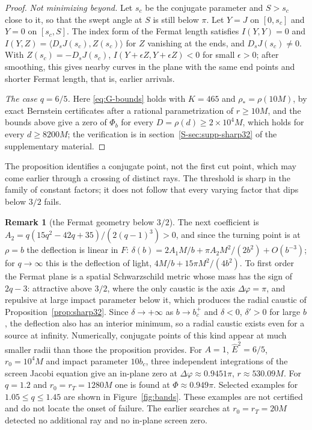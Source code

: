 \documentclass[aip,jmp,amsmath,amssymb,reprint]{revtex4-2}
\newcommand{\Ehat}{\hat E}
\theoremstyle{plain}
\theoremstyle{definition}
\newtheorem{remark}[proposition]{Remark}
\begin{document}
\begin{proof}
\emph{Not minimizing beyond.} Let $s_c$ be the conjugate parameter and $S>s_c$ close to it, so that the
swept angle at $S$ is still below $\pi$. Let $Y=J$ on $[0,s_c]$ and $Y=0$ on $[s_c,S]$. The index form of
the Fermat length satisfies $I(Y,Y)=0$ and $I(Y,Z)=\langle D_sJ(s_c),Z(s_c)\rangle$ for $Z$ vanishing at the
ends, and $D_sJ(s_c)\ne0$. With $Z(s_c)=-D_sJ(s_c)$, $I(Y+\epsilon Z,Y+\epsilon Z)<0$ for small $\epsilon>0$; after
smoothing, this gives nearby curves in the plane with the same end points and shorter Fermat
length, that is, earlier arrivals.

\emph{The case $q=6/5$.} Here \eqref{eq:G-bounds} holds with $K=465$ and $\rho_*=\rho(10M)$, by exact
Bernstein certificates after a rational parametrization of $r\ge10M$, and the bounds above give a zero of
$\Phi_b$ for every $D=\rho(d)\ge2\times10^4M$, which holds for every $d\ge8200M$; the verification is in
section~\ref{S-sec:supp-sharp32} of the supplementary material.
\end{proof}

The proposition identifies a conjugate point, not the first cut point, which may come earlier
through a crossing of distinct rays. The threshold is sharp in the family of constant factors;
it does not follow that every varying factor that dips below $3/2$ fails.

\begin{remark}[the Fermat geometry below $3/2$]\label{rmk:sharp32}
The next coefficient is $A_2=q(15q^2-42q+35)/(2(q-1)^3)>0$, and since the turning point is at
$\rho=b$ the deflection is linear in $F$: $\delta(b)=2A_1M/b+\pi A_2M^2/(2b^2)+O(b^{-3})$; for $q\to\infty$ this
is the deflection of light, $4M/b+15\pi M^2/(4b^2)$. To first order the Fermat plane is a spatial
Schwarzschild metric whose mass has the sign of $2q-3$: attractive above $3/2$, where the only
caustic is the axis $\Delta\varphi=\pi$, and repulsive at large impact parameter below it, which produces
the radial caustic of Proposition~\ref{prop:sharp32}. Since $\delta\to+\infty$ as $b\to b_c^+$ and $\delta<0$,
$\delta'>0$ for large $b$, the deflection also has an interior minimum, so a radial caustic exists even
for a source at infinity. Numerically, conjugate points of this kind appear at much smaller
radii than those the proposition provides. For $A=1$, $\Ehat^2=6/5$, $r_0=10^4M$ and impact parameter $10b_c$, three
independent integrations of the screen Jacobi equation give an in-plane zero at
$\Delta\varphi\approx0.9451\pi$, $r\approx530.09M$. For $q=1.2$ and $r_0=r_T=1280M$ one is found at $\Phi\approx0.949\pi$.
Selected examples for $1.05\le q\le1.45$ are shown in Figure~\ref{fig:bands}. These examples are not
certified and do not locate the onset of failure. The earlier searches at $r_0=r_T=20M$ detected
no additional ray and no in-plane screen zero.
\end{remark}
\end{document}
